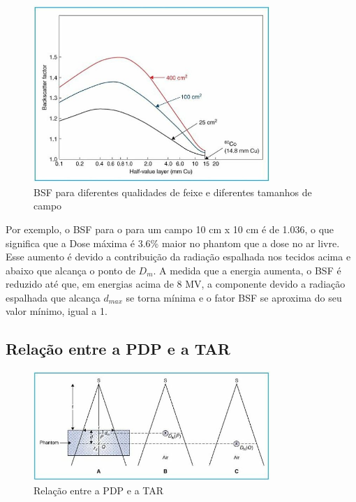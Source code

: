 \documentclass[11pt,a4paper]{article}
\newcounter{exemplo}
\begin{document}
	\begin{figure}[h]
		\centering
		\includegraphics[width=0.8\textwidth]{Imagens/bsf.JPG}
		\caption{BSF para diferentes qualidades de feixe e diferentes tamanhos de campo}
		\label{fig:bsf}                
	\end{figure}

	Por exemplo, o BSF para o  para um campo 10 cm x 10 cm é de 1.036, o que significa que a Dose máxima é 3.6\% maior no phantom que a dose no ar livre. Esse aumento é devido a contribuição da radiação espalhada nos tecidos acima e abaixo que alcança o ponto de $D_{m}$. A medida que a energia aumenta, o BSF é reduzido até que, em energias acima de 8 MV, a componente devido a radiação espalhada que alcança $d_{max}$ se torna mínima e o fator BSF se aproxima do seu valor mínimo, igual a 1. 


	\subsection{Relação entre a PDP e a TAR}

	\begin{figure}[h]
		\centering
		\includegraphics[width=0.8\textwidth]{Imagens/pdpETar.JPG}
		\caption{Relação entre a PDP e a TAR}
		\label{fig:pdpETar}                
	\end{figure}
\end{document}
